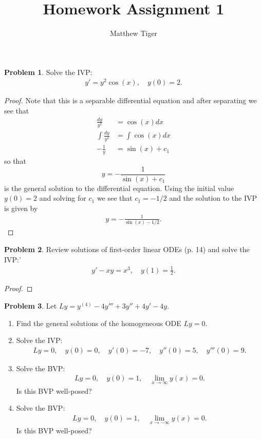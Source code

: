 \documentclass[12pt]{article}
\title{Homework Assignment 1}
\author{Matthew Tiger}
\theoremstyle{definition}
\newtheorem{problem}{Problem}
\begin{document}
\maketitle


\begin{problem}
  Solve the IVP:
  \begin{align*}
    y' = y^2\cos(x),\quad y(0)=2.
  \end{align*}
\end{problem}

\begin{proof}
  Note that this is a separable differential equation and after separating we
  see that
  \begin{align*}
    \frac{dy}{y^2} &= \cos(x)dx \\
    \int \frac{dy}{y^2} &= \int \cos(x)dx \\
    -\frac{1}{y} &= \sin(x) + c_1
  \end{align*}
  so that $$y = -\frac{1}{\sin(x) + c_1}$$ is the general solution to the differential
  equation. Using the initial value
  $y(0) = 2$ and solving for $c_1$ we see that $c_1 = -1/2$ and the solution to the IVP
  is given by
  \begin{align*}
    y = -\frac{1}{\sin(x) - 1/2}.
  \end{align*}
\end{proof}
\newpage


\begin{problem}
  Review solutions of first-order linear ODEs (p. 14) and solve the IVP:'
  \begin{align*}
    y' - xy = x^3,\quad y(1) = \frac{1}{2}.
  \end{align*}
\end{problem}

\begin{proof}
\end{proof}
\newpage


\begin{problem}
  Let $Ly = y^{(4)} - 4 y''' + 3y'' +4y' -4y$.
  \begin{enumerate}
    \item Find the general solutions of the homogeneous ODE $Ly = 0$.
    \item Solve the IVP:
      \begin{align*}
        Ly = 0,\quad y(0) = 0, \quad y'(0)= -7, \quad y''(0) = 5, \quad y'''(0) = 9.
      \end{align*}
    \item Solve the BVP:
      \begin{align*}
        Ly = 0,\quad y(0) = 1, \quad \lim_{x\to\infty}y(x) = 0.
      \end{align*}
      Is this BVP well-posed?
    \item Solve the BVP:
      \begin{align*}
        Ly = 0,\quad y(0) = 1, \quad \lim_{x\to-\infty}y(x) = 0.
      \end{align*}
      Is this BVP well-posed?
  \end{enumerate}
\end{problem}
\end{document}
